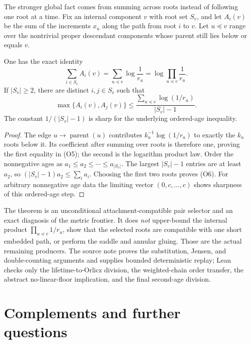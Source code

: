 \documentclass[11pt]{article}
\begin{document}
The stronger global fact comes from summing across roots instead of following
one root at a time.  Fix an internal component $v$ with root set $S_v$, and
let $A_i(v)$ be the sum of the increments $x_u$ along the path from root $i$
to $v$.  Let $u\preceq v$ range over the nontrivial proper descendant
components whose parent still lies below or equals $v$.

\begin{theorem}
\label{res:orlicz-selector}
One has the exact identity
\[
 \sum_{i\in S_v}A_i(v)
 =\sum_{u\preceq v}\log\frac1{r_u}
 =\log\prod_{u\preceq v}\frac1{r_u}.                  \tag{O5}
\]
If $|S_v|\ge2$, there are distinct $i,j\in S_v$ such that
\[
 \max\{A_i(v),A_j(v)\}
 \le
 \frac{\sum_{u\preceq v}\log(1/r_u)}{|S_v|-1}.       \tag{O6}
\]
The constant $1/(|S_v|-1)$ is sharp for the underlying ordered-age
inequality.
\end{theorem}

\begin{proof}
The edge $u\to\operatorname{parent}(u)$ contributes
$k_u^{-1}\log(1/r_u)$ to exactly the $k_u$ roots below it.  Its coefficient
after summing over roots is therefore one, proving the first equality in
(O5); the second is the logarithm product law.  Order the nonnegative ages as
$a_1\le a_2\le\cdots\le a_{|S_v|}$.  The largest $|S_v|-1$ entries are at
least $a_2$, so
$(|S_v|-1)a_2\le\sum_i a_i$.  Choosing the first two roots proves (O6).
For arbitrary nonnegative age data the limiting vector $(0,c,\ldots,c)$
shows sharpness of this ordered-age step.
\end{proof}

The theorem is an unconditional attachment-compatible pair selector and an
exact diagnosis of the metric frontier.  It does \emph{not} upper-bound the
internal product $\prod_{u\preceq v}1/r_u$, show that the selected roots are
compatible with one short embedded path, or perform the saddle and annular
gluing.  Those are the actual remaining producers.  The source note proves
the substitution, Jensen, and double-counting arguments and supplies bounded
deterministic replay; Lean checks only the lifetime-to-Orlicz division, the
weighted-chain order transfer, the abstract no-linear-floor implication, and
the final second-age division.

\section{Complements and further questions}\label{sec:open}
\end{document}
